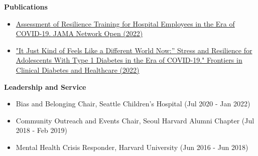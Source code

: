 \documentclass[a4paper,10pt]{article}
\begin{document}
\vspace{8pt}

\noindent
\textbf{Publications}
\begin{itemize}[noitemsep,topsep=0pt,parsep=0pt,partopsep=0pt,itemsep=2pt]
\item \href{https://jamanetwork.com/journals/jamanetworkopen/article-abstract/2793802}{Assessment of Resilience Training for Hospital Employees in the Era of COVID-19. JAMA Network Open (2022)}
\item \href{https://www.frontiersin.org/articles/10.3389/fcdhc.2022.835739/full}{"It Just Kind of Feels Like a Different World Now:” Stress and Resilience for Adolescents With Type 1 Diabetes in the Era of COVID-19." Frontiers in Clinical Diabetes and Healthcare (2022)}
\end{itemize}

\vspace{8pt}

\noindent
\textbf{Leadership and Service}
\begin{itemize}[noitemsep,topsep=0pt,parsep=0pt,partopsep=0pt,itemsep=2pt]
\item Bias and Belonging Chair, Seattle Children’s Hospital (Jul 2020 - Jan 2022)
\item Community Outreach and Events Chair, Seoul Harvard Alumni Chapter (Jul 2018 - Feb 2019)
\item Mental Health Crisis Responder, Harvard University (Jun 2016 - Jun 2018)
\end{itemize}
\end{document}

